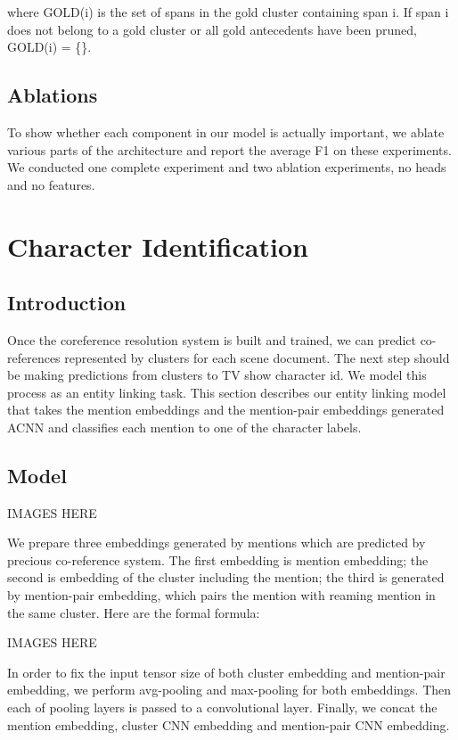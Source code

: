 \documentclass[11pt]{article}
\begin{document}
where GOLD(i) is the set of spans in the gold cluster containing span i. If span i does not belong to a gold cluster or all gold antecedents have been pruned, GOLD(i) = \{\}.

\subsection{Ablations}
To show whether each component in our model is actually important, we ablate various parts of the architecture and report the average F1 on these experiments. We conducted one complete experiment and two ablation experiments, no heads and no features.



\section{Character Identification}

\subsection{Introduction}
Once the coreference resolution system is built and trained, we can predict co-references represented by clusters for each scene document. The next step should be making predictions from clusters to TV show character id. We model this process as an entity linking task. This section describes our entity linking model that takes the mention embeddings and the mention-pair embeddings generated ACNN and classifies each mention to one of the character labels.

\subsection{Model}
IMAGES HERE

We prepare three embeddings generated by mentions which are predicted by precious co-reference system. The first embedding is mention embedding; the second is embedding of the cluster including the mention; the third is generated by mention-pair embedding, which pairs the mention with reaming mention in the same cluster. Here are the formal formula:

IMAGES HERE

In order to fix the input tensor size of both cluster embedding and mention-pair embedding, we perform avg-pooling and max-pooling for both embeddings. Then each of pooling layers is passed to a convolutional layer. Finally, we concat the mention embedding, cluster CNN embedding and mention-pair CNN embedding.
\end{document}

